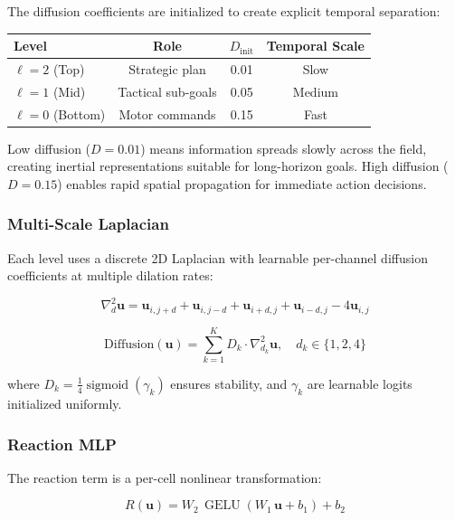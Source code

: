 \documentclass{article}
\DeclareMathOperator{\sigmoid}{sigmoid}
\DeclareMathOperator{\gelu}{GELU}
\begin{document}
The diffusion coefficients are initialized to create explicit temporal separation:

\begin{center}
\begin{tabular}{lccc}
\toprule
Level & Role & $D_{\text{init}}$ & Temporal Scale \\
\midrule
$\ell = 2$ (Top) & Strategic plan & 0.01 & Slow \\
$\ell = 1$ (Mid) & Tactical sub-goals & 0.05 & Medium \\
$\ell = 0$ (Bottom) & Motor commands & 0.15 & Fast \\
\bottomrule
\end{tabular}
\end{center}

Low diffusion ($D = 0.01$) means information spreads slowly across the field, creating inertial representations suitable for long-horizon goals. High diffusion ($D = 0.15$) enables rapid spatial propagation for immediate action decisions.

\subsubsection{Multi-Scale Laplacian}

Each level uses a discrete 2D Laplacian with learnable per-channel diffusion coefficients at multiple dilation rates:

\begin{equation}
\nabla^2_d \mathbf{u} = \mathbf{u}_{i,j+d} + \mathbf{u}_{i,j-d} + \mathbf{u}_{i+d,j} + \mathbf{u}_{i-d,j} - 4\mathbf{u}_{i,j}
\end{equation}

\begin{equation}
\text{Diffusion}(\mathbf{u}) = \sum_{k=1}^{K} D_k \cdot \nabla^2_{d_k} \mathbf{u}, \quad d_k \in \{1, 2, 4\}
\end{equation}

where $D_k = \frac{1}{4}\sigmoid(\gamma_k)$ ensures stability, and $\gamma_k$ are learnable logits initialized uniformly.

\subsubsection{Reaction MLP}

The reaction term is a per-cell nonlinear transformation:

\begin{equation}
R(\mathbf{u}) = W_2 \, \gelu(W_1 \, \mathbf{u} + b_1) + b_2
\end{equation}
\end{document}
